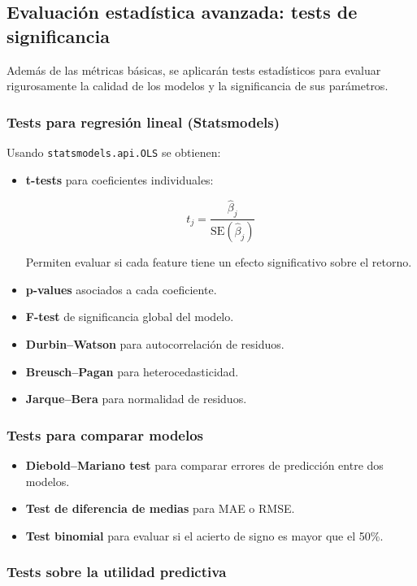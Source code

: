 \documentclass[12pt]{article}
\begin{document}
\subsection{Evaluación estadística avanzada: tests de significancia}

Además de las métricas básicas, se aplicarán tests estadísticos para evaluar rigurosamente la calidad de los modelos y la significancia de sus parámetros.

\subsubsection{Tests para regresión lineal (Statsmodels)}

Usando \texttt{statsmodels.api.OLS} se obtienen:

\begin{itemize}
    \item \textbf{t-tests} para coeficientes individuales:
    

\[
    t_j = \frac{\hat{\beta}_j}{\text{SE}(\hat{\beta}_j)}
    \]


    Permiten evaluar si cada feature tiene un efecto significativo sobre el retorno.
    \item \textbf{p-values} asociados a cada coeficiente.
    \item \textbf{F-test} de significancia global del modelo.
    \item \textbf{Durbin–Watson} para autocorrelación de residuos.
    \item \textbf{Breusch–Pagan} para heterocedasticidad.
    \item \textbf{Jarque–Bera} para normalidad de residuos.
\end{itemize}

\subsubsection{Tests para comparar modelos}

\begin{itemize}
    \item \textbf{Diebold–Mariano test} para comparar errores de predicción entre dos modelos.
    \item \textbf{Test de diferencia de medias} para MAE o RMSE.
    \item \textbf{Test binomial} para evaluar si el acierto de signo es mayor que el 50\%.
\end{itemize}

\subsubsection{Tests sobre la utilidad predictiva}
\end{document}

